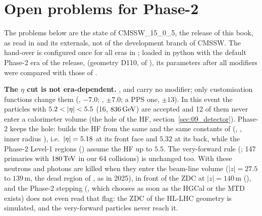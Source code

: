 \FloatBarrier
\section{Open problems for Phase-2}
\label{sec:09_open}

The problems below are the state of CMSSW\_15\_0\_5, the release of this book, as read in
 and its externals, not of the development branch of CMSSW. The hand-over is
configured once for all eras in ; loaded in python with the
default Phase-2 era of the release,  (geometry D110,  of
), its parameters after all modifiers were compared with those of .

\textbf{The $\eta$ cut is not era-dependent.} ,  and
 carry no modifier; only customisation functions change them (,
$-7.0$; , $\pm7.0$; a PPS one, $\pm13$). In this event the particles with
$5.2<\abseta<5.5$ (16, $836\,\mathrm{GeV}$) are accepted and 12 of them never enter a calorimeter volume (the hole of the HF,
section~\ref{sec:09_detector}). Phase-2 keeps the hole:  builds the HF
from the same  and the same constants of  (,
, inner radius ), i.e.\ $|\eta| = 5.18$ at its front
face and $5.32$ at its back, while the Phase-2 Level-1 regions () assume the HF up to $5.5$.
The very-forward rule (; 147 primaries with $180\,\mathrm{TeV}$ in our 64 collisions) is unchanged
too. With  these neutrons and photons are killed when they enter the
beam-line volume  ($|z|=27.5$ to $139$\,m, the dead region  of
, as in 2025), in front of the ZDC at $|z|=140$\,m (), and the
Phase-2 stepping (, which  chooses as soon as the HGCal or the MTD
exists) does not even read that flag: the ZDC of the HL-LHC geometry is simulated, and the
very-forward particles never reach it.

